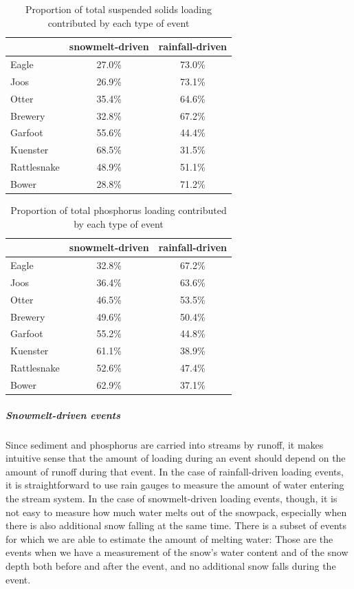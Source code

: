 \documentclass[10pt]{article}
\begin{document}
\begin{table}[ht]
\begin{center}
\begin{tabular}{lcc}
  & snowmelt-driven & rainfall-driven \\ 
  \hline
Eagle & 27.0\% & 73.0\% \\ 
  Joos & 26.9\% & 73.1\% \\ 
  Otter & 35.4\% & 64.6\% \\ 
  Brewery & 32.8\% & 67.2\% \\ 
  Garfoot & 55.6\% & 44.4\% \\ 
  Kuenster & 68.5\% & 31.5\% \\ 
  Rattlesnake & 48.9\% & 51.1\% \\ 
  Bower & 28.8\% & 71.2\% \\ 
  \end{tabular}
\caption{Proportion of total suspended solids loading contributed by each type of event}
\label{tab:stot}
\end{center}
\end{table}
\begin{table}[ht]
\begin{center}
\begin{tabular}{lcc}
  & snowmelt-driven & rainfall-driven \\ 
  \hline
Eagle & 32.8\% & 67.2\% \\ 
  Joos & 36.4\% & 63.6\% \\ 
  Otter & 46.5\% & 53.5\% \\ 
  Brewery & 49.6\% & 50.4\% \\ 
  Garfoot & 55.2\% & 44.8\% \\ 
  Kuenster & 61.1\% & 38.9\% \\ 
  Rattlesnake & 52.6\% & 47.4\% \\ 
  Bower & 62.9\% & 37.1\% \\ 
  \end{tabular}
\caption{Proportion of total phosphorus loading contributed by each type of event}
\label{tab:ptot}
\end{center}
\end{table}
\subparagraph{Snowmelt-driven events}
Since sediment and phosphorus are carried into streams by runoff, it makes intuitive sense that the amount of loading during an event should depend on the amount of runoff during that event. In the case of rainfall-driven loading events, it is straightforward to use rain gauges to measure the amount of water entering the stream system. In the case of snowmelt-driven loading events, though, it is not easy to measure how much water melts out of the snowpack, especially when there is also additional snow falling at the same time. There is a subset of events for which we are able to estimate the amount of melting water: Those are the events when we have a measurement of the snow's water content and of the snow depth both before and after the event, and no additional snow falls during the event.\\
\end{document}
